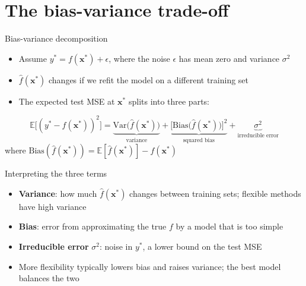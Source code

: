 \section{The bias-variance trade-off}


\begin{frame}{Bias-variance decomposition}
    \begin{itemize}
        \item Assume $y^\ast = f(\mathbf{x}^\ast) + \epsilon$, where the noise $\epsilon$ has mean zero and variance $\sigma^2$
        \item $\hat{f}(\mathbf{x}^\ast)$ changes if we refit the model on a different training set
        \item The expected test MSE at $\mathbf{x}^\ast$ splits into three parts:
    \end{itemize}
    \[
        \mathbb{E}\big[(y^\ast - \hat{f}(\mathbf{x}^\ast))^2\big]
        = \underbrace{\mathrm{Var}\big(\hat{f}(\mathbf{x}^\ast)\big)}_{\text{variance}}
        + \underbrace{\big[\mathrm{Bias}\big(\hat{f}(\mathbf{x}^\ast)\big)\big]^2}_{\text{squared bias}}
        + \underbrace{\sigma^2}_{\text{irreducible error}}
    \]
    where $\mathrm{Bias}(\hat{f}(\mathbf{x}^\ast)) = \mathbb{E}[\hat{f}(\mathbf{x}^\ast)] - f(\mathbf{x}^\ast)$
\end{frame}


\begin{frame}{Interpreting the three terms}
    \begin{itemize}
        \item \textbf{Variance}: how much $\hat{f}(\mathbf{x}^\ast)$ changes between training sets; flexible methods have high variance
        \item \textbf{Bias}: error from approximating the true $f$ by a model that is too simple
        \item \textbf{Irreducible error} $\sigma^2$: noise in $y^\ast$, a lower bound on the test MSE
        \item More flexibility typically lowers bias and raises variance; the best model balances the two
    \end{itemize}
\end{frame}


